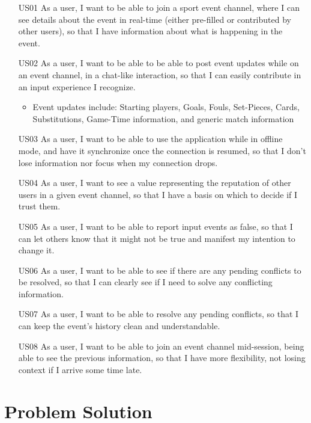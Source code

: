 \begin{itemize}[leftmargin  = 3.25\parindent, align=left]
    \item[US01] As a user, I want to be able to join a sport event channel, where I can see details about the event in real-time (either pre-filled or contributed by other users), so that I have information about what is happening in the event.
    \item[US02] As a user, I want to be able to be able to post event updates while on an event channel, in a chat-like interaction, so that I can easily contribute in an input experience I recognize.
    \begin{itemize}
        \item Event updates include: Starting players, Goals, Fouls, Set-Pieces, Cards, Substitutions, Game-Time information, and generic match information
    \end{itemize} 
    \item[US03] As a user, I want to be able to use the application while in offline mode, and have it synchronize once the connection is resumed, so that I don't lose information nor focus when my connection drops.
    \item[US04] As a user, I want to see a value representing the reputation of other users in a given event channel, so that I have a basis on which to decide if I trust them. 
    \item[US05] As a user, I want to be able to report input events as false, so that I can let others know that it might not be true and manifest my intention to change it.
    \item[US06] As a user, I want to be able to see if there are any pending conflicts to be resolved, so that I can clearly see if I need to solve any conflicting information.
    \item[US07] As a user, I want to be able to resolve any pending conflicts, so that I can keep the event's history clean and understandable.
    \item[US08] As a user, I want to be able to join an event channel mid-session, being able to see the previous information, so that I have more flexibility, not losing context if I arrive some time late.
\end{itemize}

\section{Problem Solution}\label{sec:prob-sol}

